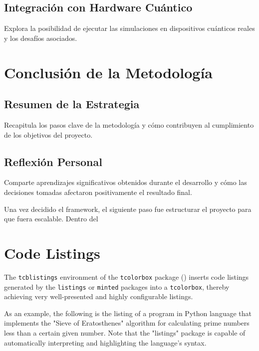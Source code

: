 \subsection{Integración con Hardware Cuántico}
Explora la posibilidad de ejecutar las simulaciones en dispositivos cuánticos reales y los desafíos asociados.

\section{Conclusión de la Metodología}

\subsection{Resumen de la Estrategia}
Recapitula los pasos clave de la metodología y cómo contribuyen al cumplimiento de los objetivos del proyecto.

\subsection{Reflexión Personal}
Comparte aprendizajes significativos obtenidos durante el desarrollo y cómo las decisiones tomadas afectaron positivamente el resultado final.

Una vez decidido el framework, el siguiente paso fue estructurar el proyecto para que fuera escalable. Dentro del 




\section{Code Listings}

The \texttt{tcblistings} environment of the \texttt{tcolorbox} package (\cite{tcolorbox}) inserts code listings generated by the \texttt{listings} or \texttt{minted} packages into a \texttt{tcolorbox}, thereby achieving very well-presented and highly con\-fi\-gu\-ra\-ble listings.

As an example, the following is the listing of a program in Python language that implements the "Sieve of Eratosthenes" algorithm for calculating prime numbers less than a certain given number. Note that the "listings" package is capable of automatically interpreting and highlighting the language's syntax.


